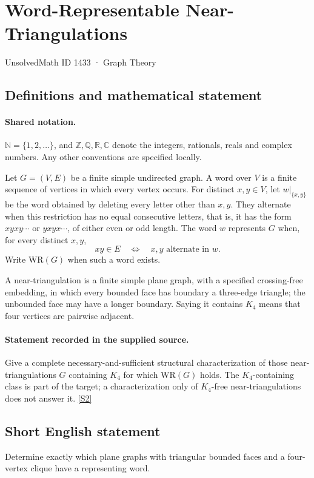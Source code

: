 \documentclass[11pt]{article}
\newcommand{\sref}[2]{\hyperlink{source:#1:#2}{[S#2]}}
\begin{document}
\setcounter{section}{1432}
\section{Word-Representable Near-Triangulations}\label{1433}
{\small\sffamily UnsolvedMath ID 1433 · Graph Theory}
\subsection{Definitions and mathematical statement}

\paragraph{Shared notation.}$\mathbb N=\{1,2,\ldots\}$, and $\mathbb Z,\mathbb Q,\mathbb R,\mathbb C$ denote the integers, rationals, reals and complex numbers. Any other conventions are specified locally.


Let $G=(V,E)$ be a finite simple undirected graph. A word over $V$ is a finite sequence of vertices in which every vertex occurs. For distinct $x,y\in V$, let $w|_{\{x,y\}}$ be the word obtained by deleting every letter other than $x,y$. They alternate when this restriction has no equal consecutive letters, that is, it has the form $xyxy\cdots$ or $yxyx\cdots$, of either even or odd length. The word $w$ represents $G$ when, for every distinct $x,y$,
\[
 xy\in E\quad\Longleftrightarrow\quad x,y\text{ alternate in }w.
\]
Write $\mathrm{WR}(G)$ when such a word exists.

A near-triangulation is a finite simple plane graph, with a specified crossing-free embedding, in which every bounded face has boundary a three-edge triangle; the unbounded face may have a longer boundary. Saying it contains $K_4$ means that four vertices are pairwise adjacent.
\paragraph{Statement recorded in the supplied source.}
Give a complete necessary-and-sufficient structural characterization of those near-triangulations $G$ containing $K_4$ for which $\mathrm{WR}(G)$ holds. The $K_4$-containing class is part of the target; a characterization only of $K_4$-free near-triangulations does not answer it. \sref{1433}{2}
\subsection{Short English statement}
Determine exactly which plane graphs with triangular bounded faces and a four-vertex clique have a representing word.
\end{document}
